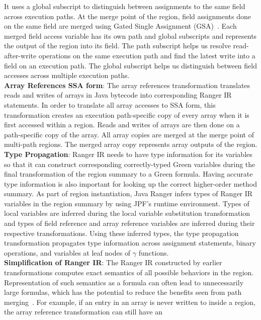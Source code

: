 %
It uses a global subscript to distinguish between assignments to the same field across execution paths.
%
At the merge point of the region, field assignments done on the same field are merged using
Gated Single Assignment (GSA)~\cite{Ottenstein1990}.
%
Each merged field access variable has its own path and global subscripts and represents the output of the region into
its field.
%
The path subscript helps us resolve read-after-write operations on the same execution path and find the latest write
into a field on an execution path.
%
The global subscript helps us distinguish between field accesses across multiple execution paths. \\
\textbf{Array References SSA form}: The array references transformation translates reads and writes of arrays in
Java bytecode into corresponding Ranger IR statements.
%
In order to translate all array accesses to SSA form, this transformation creates an execution path-specific copy of
every array when it is first accessed within a region.
%
Reads and writes of arrays are then done on a path-specific copy of the array.
%
All array copies are merged at the merge point of multi-path regions.
%
The merged array copy represents array outputs of the region.\\
\textbf{Type Propagation}: Ranger IR needs to have type information for its variables so that it can construct
corresponding correctly-typed Green variables during the final transformation of the region summary to a Green formula.
%
Having accurate type information is also important for looking up the correct higher-order method summary.
%
As part of region instantiation, Java Ranger infers types of Ranger IR variables in the region summary by
using JPF's runtime environment.
%
Types of local variables are inferred during the local variable substitution transformation and types of field reference
and array reference variables are inferred during their respective transformations.
%
Using these inferred types, the type propagation transformation propagates type information across assignment
statements, binary operations, and variables at leaf nodes of $\gamma$ functions.\\
%
\textbf{Simplification of Ranger IR}: The Ranger IR constructed by earlier transformations computes exact semantics
of all possible behaviors in the region.
%
Representation of such semantics as a formula can often lead to unnecessarily large formulas, which has the potential to
reduce the benefits seen from path merging~\cite{angr}.
%
For example, if an entry in an array is never written to inside a region, the array reference transformation can still have an
